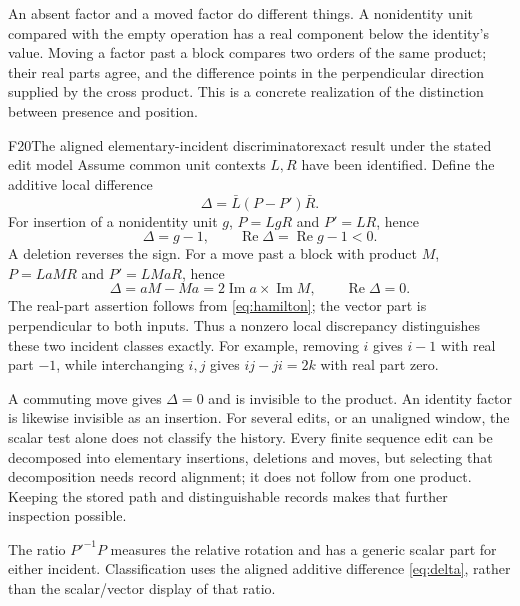 \documentclass[11pt,a4paper]{article}
\DeclareMathOperator{\Real}{Re}
\DeclareMathOperator{\Imag}{Im}
\begin{document}
An absent factor and a moved factor do different things. A nonidentity unit
compared with the empty operation has a real component below the identity's
value. Moving a factor past a block compares two orders of the same product;
their real parts agree, and the difference points in the perpendicular
direction supplied by the cross product. This is a concrete realization of
the distinction between presence and position.

\begin{formal}{F20}{The aligned elementary-incident discriminator}{exact result under the stated edit model}
Assume common unit contexts $L,R$ have been identified. Define the additive
local difference
\begin{equation}\label{eq:delta}
 \Delta=\bar L(P-P')\bar R.
\end{equation}
For insertion of a nonidentity unit $g$, $P=LgR$ and $P'=LR$, hence
\begin{equation}\label{eq:missing}
 \Delta=g-1,\qquad \Real\Delta=\Real g-1<0.
\end{equation}
A deletion reverses the sign. For a move past a block with product $M$,
$P=LaMR$ and $P'=LMaR$, hence
\begin{equation}\label{eq:moved}
 \Delta=aM-Ma=2\Imag a\times\Imag M,\qquad\Real\Delta=0.
\end{equation}
The real-part assertion follows from \eqref{eq:hamilton}; the vector part is
perpendicular to both inputs. Thus a nonzero local discrepancy distinguishes
these two incident classes exactly. For example, removing $i$ gives $i-1$
with real part $-1$, while interchanging $i,j$ gives $ij-ji=2k$ with real
part zero.

A commuting move gives $\Delta=0$ and is invisible to the product. An identity
factor is likewise invisible as an insertion. For several edits, or an
unaligned window, the scalar test alone does not classify the history.
Every finite sequence edit can be decomposed into elementary insertions,
deletions and moves, but selecting that decomposition needs record alignment;
it does not follow from one product. Keeping the stored path and distinguishable
records makes that further inspection possible.

The ratio $P'^{-1}P$ measures the relative rotation and has a generic scalar
part for either incident. Classification uses the aligned additive difference
\eqref{eq:delta}, rather than the scalar/vector display of that ratio.
\end{formal}
\end{document}
